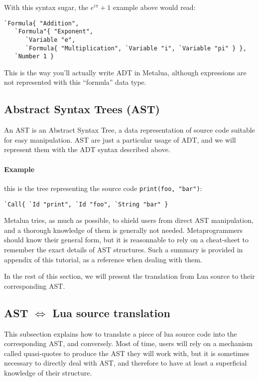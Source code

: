 With this syntax sugar, the $e^{i\pi}+1$ example above would read:
\begin{verbatim}
`Formula{ "Addition", 
   `Formula"{ "Exponent", 
      `Variable "e",
      `Formula{ "Multiplication", `Variable "i", `Variable "pi" } },
   `Number 1 }
\end{verbatim}

This is the way you'll actually write ADT in Metalua, although
expressions are not represented with this ``formula'' data type.

\subsection{Abstract Syntax Trees (AST)}

An AST is an Abstract Syntax Tree, a data representation of source
code suitable for easy manipulation. AST are just a particular usage
of ADT, and we will represent them with the ADT syntax described
above.

\paragraph{Example} this is the tree representing the source code
\verb+print(foo, "bar")+:

\verb+`Call{ `Id "print", `Id "foo", `String "bar" }+

Metalua tries, as much as possible, to shield users from direct AST
manipulation, and a thorough knowledge of them is generally not
needed. Metaprogrammers should know their general form, but it is
reasonnable to rely on a cheat-sheet to remember the exact details of
AST structures. Such a summary is provided
in appendix of this tutorial, as a reference when dealing with them.

In the rest of this section, we will present the translation from Lua
source to their corresponding AST.

\subsection{AST  $\Longleftrightarrow$ Lua source translation}

This subsection explains how to translate a piece of lua source code
into the corresponding AST, and conversely. Most of time, users will
rely on a mechanism called quasi-quotes to produce the AST they will
work with, but it is sometimes necessary to directly deal with AST,
and therefore to have at least a superficial knowledge of their
structure.

